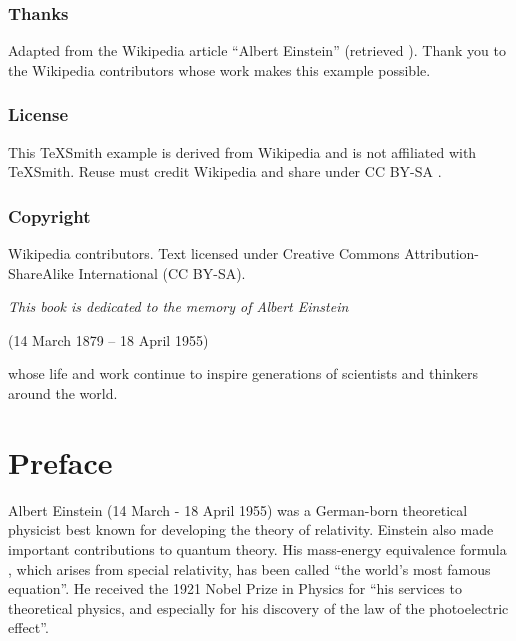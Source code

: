 \documentclass[twoside]{memoir}
\title{\Huge\bfseries\booktitle}
\author{\bookauthor}
\begin{document}
\hypersetup{pageanchor=false}
\frontmatter
\maketitle
\thispagestyle{empty}
\cleardoublepage
\thispagestyle{plain}
\subsection*{Thanks}
Adapted from the Wikipedia article “Albert Einstein” (retrieved ).
Thank you to the Wikipedia contributors whose work makes this example possible.
\subsection*{License}
This TeXSmith example is derived from Wikipedia and is not affiliated with TeXSmith.
Reuse must credit Wikipedia and share under CC BY-SA .
\subsection*{Copyright}
Wikipedia contributors. Text licensed under Creative Commons Attribution-ShareAlike
International (CC BY-SA).

\cleardoublepage
\thispagestyle{plain}
\begin{center}
  \vspace*{3cm}
  {\Large\itshape This book is dedicated to the memory of Albert Einstein

\vspace{1em}
(14 March 1879 -- 18 April 1955)

\vspace{1em}
whose life and work continue to inspire generations of scientists and thinkers around the world.
}
\end{center}

\thispagestyle{empty}

\raggedbottom

\cleardoublepage
\thispagestyle{plain}
\begingroup
{}
\chapter*{Preface}\label{preface}

Albert Einstein (14 March - 18 April 1955) was a German-born theoretical physicist best known for developing the theory of relativity. Einstein also made important contributions to quantum theory. His mass-energy equivalence formula , which arises from special relativity, has been called \enquote{the world's most famous equation}.\cite{LnLVo} He received the 1921 Nobel Prize in Physics for \enquote{his services to theoretical physics, and especially for his discovery of the law of the photoelectric effect}.  
\end{document}
